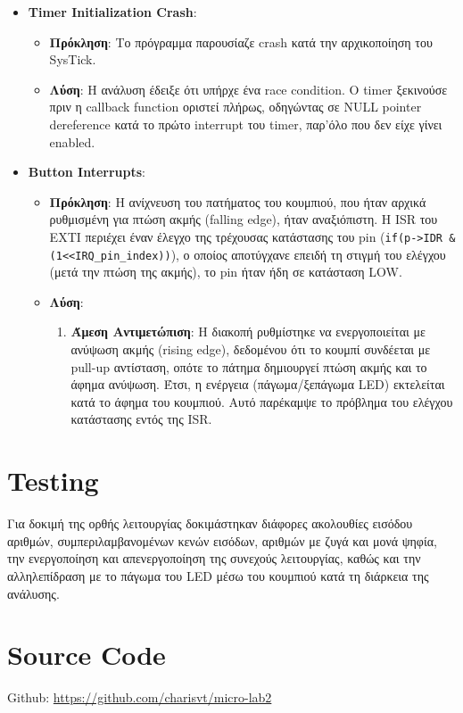 \documentclass{article}
\begin{document}
\begin{itemize}
    \item \textbf{Timer Initialization Crash}:
    \begin{itemize}
        \item \textbf{Πρόκληση}: Το πρόγραμμα παρουσίαζε crash κατά την αρχικοποίηση του SysTick.
        \item \textbf{Λύση}: Η ανάλυση έδειξε ότι υπήρχε ένα race condition. Ο timer ξεκινούσε πριν η callback function οριστεί πλήρως, οδηγώντας σε NULL pointer dereference κατά το πρώτο interrupt του timer, παρ'όλο που δεν είχε γίνει enabled.
    \end{itemize}

    \item \textbf{Button Interrupts}:
    \begin{itemize}
        \item \textbf{Πρόκληση}: Η ανίχνευση του πατήματος του κουμπιού, που ήταν αρχικά ρυθμισμένη για πτώση ακμής (falling edge), ήταν αναξιόπιστη. Η ISR του EXTI περιέχει έναν έλεγχο της τρέχουσας κατάστασης του pin (\texttt{if(p->IDR & (1<<IRQ\_pin\_index))}), ο οποίος αποτύγχανε επειδή τη στιγμή του ελέγχου (μετά την πτώση της ακμής), το pin ήταν ήδη σε κατάσταση LOW.
        \item \textbf{Λύση}:
            \begin{enumerate}
                \item \textbf{Άμεση Αντιμετώπιση}: Η διακοπή ρυθμίστηκε να ενεργοποιείται με ανύψωση ακμής (rising edge), δεδομένου ότι το κουμπί συνδέεται με pull-up αντίσταση, οπότε το πάτημα δημιουργεί πτώση ακμής και το άφημα ανύψωση. Έτσι, η ενέργεια (πάγωμα/ξεπάγωμα LED) εκτελείται κατά το άφημα του κουμπιού. Αυτό παρέκαμψε το πρόβλημα του ελέγχου κατάστασης εντός της ISR.
            \end{enumerate}
    \end{itemize}
\end{itemize}

\section{Testing}
Για δοκιμή της ορθής λειτουργίας δοκιμάστηκαν διάφορες ακολουθίες εισόδου αριθμών, συμπεριλαμβανομένων κενών εισόδων, αριθμών με ζυγά και μονά ψηφία, την ενεργοποίηση και απενεργοποίηση της συνεχούς λειτουργίας, καθώς και την αλληλεπίδραση με το πάγωμα του LED μέσω του κουμπιού κατά τη διάρκεια της ανάλυσης.
\section{Source Code}
Github:
\href{https://github.com/charisvt/micro-lab2}{https://github.com/charisvt/micro-lab2}
\end{document}

